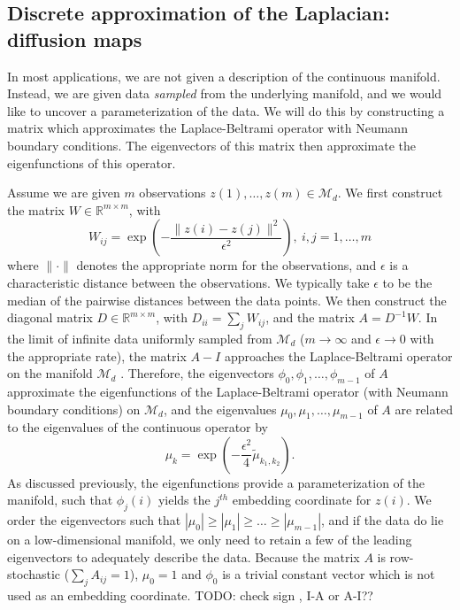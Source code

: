 \documentclass[preprint]{elsarticle}
\begin{document}
\subsection{Discrete approximation of the Laplacian: diffusion maps}

In most applications, we are not given a description of the continuous manifold. 
%
Instead, we are given data {\em sampled} from the underlying manifold, and we would like to uncover a parameterization of the data.
%
We will do this by constructing a matrix which approximates the Laplace-Beltrami operator with Neumann boundary conditions. 
%
The eigenvectors of this matrix then approximate the eigenfunctions of this operator.

Assume we are given $m$ observations $z(1), \dots, z(m) \in \mathcal{M}_d$. 
%
We first construct the matrix $W \in \mathbb{R}^{m \times m}$, with
\begin{equation} \label{eq:W}
W_{ij} = \exp \left( -\frac{\|z(i) - z(j) \|^2}{\epsilon^2} \right), \ i,j=1,\ldots,m
\end{equation}
where $\| \cdot \|$ denotes the appropriate norm for the observations, and $\epsilon$ is a characteristic distance between the observations. 
%
We typically take $\epsilon$ to be the median of the pairwise distances between the data points.
%
We then construct the diagonal matrix $D \in \mathbb{R}^{m \times m}$, with $D_{ii} = \sum_j W_{ij}$, and the matrix $A  = D^{-1} W.$
%
In the limit of infinite data uniformly sampled from $\mathcal{M}_d$ ($m \rightarrow \infty$ and $\epsilon \rightarrow 0$ with the appropriate rate), the matrix $A-I$ approaches the Laplace-Beltrami operator on the manifold $\mathcal{M}_d$ \cite{coifman2006geometric}. 
%
Therefore, the eigenvectors $\phi_0, \phi_1, \dots, \phi_{m-1}$ of $A$ approximate the eigenfunctions of the Laplace-Beltrami operator (with Neumann boundary conditions) on $\mathcal{M}_d$,
and the eigenvalues $\mu_0, \mu_1, \dots, \mu_{m-1}$ of $A$ are related to the eigenvalues of the continuous operator by 
\begin{equation} \label{eq:evals_relationship}
\mu_k = \exp \left( -\frac{\epsilon^2}{4} \tilde{\mu}_{k_1, k_2}  \right).
\end{equation}
%
As discussed previously, the eigenfunctions provide a parameterization of the manifold, such that $\phi_{j}(i)$ yields the $j^{th}$ embedding coordinate for $z(i)$.
%
We order the eigenvectors such that $|\mu_0| \ge |\mu_1| \ge \dots \ge |\mu_{m-1}|$, and if the data do lie on a low-dimensional manifold, we only need to retain a few of the leading eigenvectors to adequately describe the data.
%
Because the matrix $A$ is row-stochastic ($\sum_j A_{ij} = 1$),  $\mu_0 = 1$ and $\phi_0$ is a trivial constant vector which is not used as an embedding coordinate.
TODO: check sign , I-A or A-I??
\end{document}
